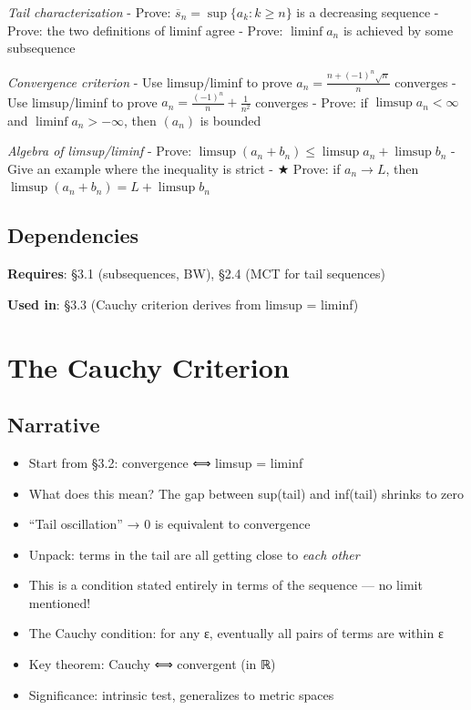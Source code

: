 \documentclass[
  10pt,
  letterpaper,
]{scrbook}
\providecommand{\tightlist}{%
  \setlength{\itemsep}{0pt}\setlength{\parskip}{0pt}}
\begin{document}
\emph{Tail characterization} - Prove:
\(\overline{s}_n = \sup\{a_k : k \geq n\}\) is a decreasing sequence -
Prove: the two definitions of liminf agree - Prove: \(\liminf a_n\) is
achieved by some subsequence

\emph{Convergence criterion} - Use limsup/liminf to prove
\(a_n = \frac{n + (-1)^n \sqrt{n}}{n}\) converges - Use limsup/liminf to
prove \(a_n = \frac{(-1)^n}{n} + \frac{1}{n^2}\) converges - Prove: if
\(\limsup a_n < \infty\) and \(\liminf a_n > -\infty\), then \((a_n)\)
is bounded

\emph{Algebra of limsup/liminf} - Prove:
\(\limsup(a_n + b_n) \leq \limsup a_n + \limsup b_n\) - Give an example
where the inequality is strict - ★ Prove: if \(a_n \to L\), then
\(\limsup(a_n + b_n) = L + \limsup b_n\)

\subsection{Dependencies}\label{dependencies-12}

\textbf{Requires}: §3.1 (subsequences, BW), §2.4 (MCT for tail
sequences)

\textbf{Used in}: §3.3 (Cauchy criterion derives from limsup = liminf)

\section{The Cauchy Criterion}\label{the-cauchy-criterion}

\subsection{Narrative}\label{narrative-13}

\begin{itemize}
\tightlist
\item
  Start from §3.2: convergence ⟺ limsup = liminf
\item
  What does this mean? The gap between sup(tail) and inf(tail) shrinks
  to zero
\item
  ``Tail oscillation'' → 0 is equivalent to convergence
\item
  Unpack: terms in the tail are all getting close to \emph{each other}
\item
  This is a condition stated entirely in terms of the sequence --- no
  limit mentioned!
\item
  The Cauchy condition: for any ε, eventually all pairs of terms are
  within ε
\item
  Key theorem: Cauchy ⟺ convergent (in ℝ)
\item
  Significance: intrinsic test, generalizes to metric spaces
\end{itemize}
\end{document}

